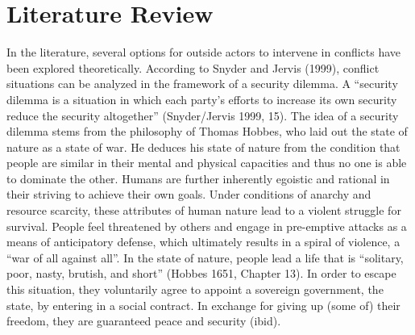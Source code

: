 \documentclass[]{article}
\begin{document}
\section{Literature Review}\label{literature-review}

In the literature, several options for outside actors to intervene in
conflicts have been explored theoretically. According to Snyder and
Jervis (1999), conflict situations can be analyzed in the framework of a
security dilemma. A ``security dilemma is a situation in which each
party's efforts to increase its own security reduce the security
altogether'' (Snyder/Jervis 1999, 15). The idea of a security dilemma
stems from the philosophy of Thomas Hobbes, who laid out the state of
nature as a state of war. He deduces his state of nature from the
condition that people are similar in their mental and physical
capacities and thus no one is able to dominate the other. Humans are
further inherently egoistic and rational in their striving to achieve
their own goals. Under conditions of anarchy and resource scarcity,
these attributes of human nature lead to a violent struggle for
survival. People feel threatened by others and engage in pre-emptive
attacks as a means of anticipatory defense, which ultimately results in
a spiral of violence, a ``war of all against all''. In the state of
nature, people lead a life that is ``solitary, poor, nasty, brutish, and
short'' (Hobbes 1651, Chapter 13). In order to escape this situation,
they voluntarily agree to appoint a sovereign government, the state, by
entering in a social contract. In exchange for giving up (some of) their
freedom, they are guaranteed peace and security (ibid).
\end{document}
